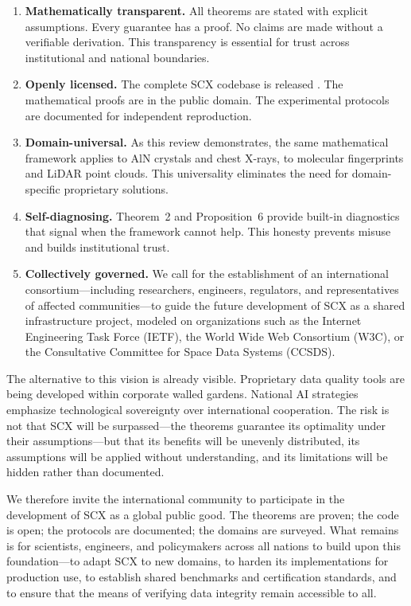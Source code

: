 \documentclass[twocolumn]{article}
\theoremstyle{definition}
\begin{document}
\begin{enumerate}[nosep,leftmargin=*,itemsep=1pt]
  \item \textbf{Mathematically transparent.} All theorems are stated with explicit assumptions. Every guarantee has a proof. No claims are made without a verifiable derivation. This transparency is essential for trust across institutional and national boundaries.
  \item \textbf{Openly licensed.} The complete SCX codebase is released . The mathematical proofs are in the public domain. The experimental protocols are documented for independent reproduction.
  \item \textbf{Domain-universal.} As this review demonstrates, the same mathematical framework applies to AlN crystals and chest X-rays, to molecular fingerprints and LiDAR point clouds. This universality eliminates the need for domain-specific proprietary solutions.
  \item \textbf{Self-diagnosing.} Theorem~2 and Proposition~6 provide built-in diagnostics that signal when the framework cannot help. This honesty prevents misuse and builds institutional trust.
  \item \textbf{Collectively governed.} We call for the establishment of an international consortium---including researchers, engineers, regulators, and representatives of affected communities---to guide the future development of SCX as a shared infrastructure project, modeled on organizations such as the Internet Engineering Task Force (IETF), the World Wide Web Consortium (W3C), or the Consultative Committee for Space Data Systems (CCSDS).
\end{enumerate}

The alternative to this vision is already visible. Proprietary data quality tools are being developed within corporate walled gardens. National AI strategies emphasize technological sovereignty over international cooperation. The risk is not that SCX will be surpassed---the theorems guarantee its optimality under their assumptions---but that its benefits will be unevenly distributed, its assumptions will be applied without understanding, and its limitations will be hidden rather than documented.

We therefore invite the international community to participate in the development of SCX as a global public good. The theorems are proven; the code is open; the protocols are documented; the domains are surveyed. What remains is for scientists, engineers, and policymakers across all nations to build upon this foundation---to adapt SCX to new domains, to harden its implementations for production use, to establish shared benchmarks and certification standards, and to ensure that the means of verifying data integrity remain accessible to all.
\end{document}
